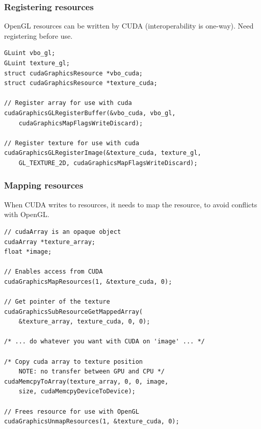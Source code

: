 \begin{frame}[fragile]

\frametitle{Registering resources}

OpenGL resources can be written by CUDA (interoperability is one-way).
Need registering before use.

\vspace{5mm}

\begin{lstlisting}
GLuint vbo_gl;
GLuint texture_gl;
struct cudaGraphicsResource *vbo_cuda;
struct cudaGraphicsResource *texture_cuda;

// Register array for use with cuda
cudaGraphicsGLRegisterBuffer(&vbo_cuda, vbo_gl,
	cudaGraphicsMapFlagsWriteDiscard);

// Register texture for use with cuda
cudaGraphicsGLRegisterImage(&texture_cuda, texture_gl,
	GL_TEXTURE_2D, cudaGraphicsMapFlagsWriteDiscard);
\end{lstlisting}

\end{frame}


\begin{frame}[fragile]

\frametitle{Mapping resources}

\vspace{3mm}

When CUDA writes to resources, it needs to map the resource,
to avoid conflicts with OpenGL.

\vspace{2mm}

\begin{lstlisting}
// cudaArray is an opaque object
cudaArray *texture_array;
float *image;

// Enables access from CUDA
cudaGraphicsMapResources(1, &texture_cuda, 0);

// Get pointer of the texture
cudaGraphicsSubResourceGetMappedArray(
	&texture_array, texture_cuda, 0, 0);

/* ... do whatever you want with CUDA on 'image' ... */

/* Copy cuda array to texture position
	NOTE: no transfer between GPU and CPU */
cudaMemcpyToArray(texture_array, 0, 0, image,
	size, cudaMemcpyDeviceToDevice);

// Frees resource for use with OpenGL
cudaGraphicsUnmapResources(1, &texture_cuda, 0);

\end{lstlisting}

\end{frame}


